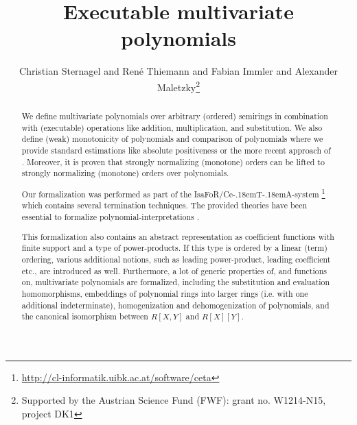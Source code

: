 \documentclass[11pt,a4paper]{article}
\newcommand\isafor{\textsf{IsaFoR}}
\newcommand\ceta{\textsf{Ce\kern-.18emT\kern-.18emA}}
\begin{document}
\title{Executable multivariate polynomials}
\author{Christian Sternagel and Ren\'e Thiemann and Fabian Immler and Alexander
Maletzky\thanks{Supported by the Austrian Science Fund (FWF): grant no. W1214-N15, project DK1}}
\maketitle

\begin{abstract}
  We define multivariate polynomials over arbitrary (ordered)
  semirings in combination with (executable) operations like addition, multiplication,
  and substitution. We also define (weak) monotonicity of polynomials
  and comparison of polynomials where we provide standard estimations 
  like absolute positiveness or the more recent
  approach of \cite{NZM10}. Moreover, it is proven
  that strongly normalizing (monotone) orders
  can be lifted to strongly normalizing (monotone) orders over polynomials.

  Our formalization was performed as part of the \isafor/\ceta-system 
  \cite{CeTA}\footnote{\url{http://cl-informatik.uibk.ac.at/software/ceta}}
  which
  contains several termination techniques. The provided theories have been
  essential to formalize polynomial-interpretations \cite{L79,Rational}.

  This formalization also contains an abstract representation as coefficient functions with finite
  support and a type of power-products. If this type is ordered by a linear (term) ordering, various
  additional notions, such as leading power-product, leading coefficient etc., are introduced as
  well. Furthermore, a lot of generic properties of, and functions on, multivariate polynomials 
  are formalized, including the substitution and evaluation homomorphisms, embeddings of polynomial 
  rings into larger rings (i.e. with one additional indeterminate), homogenization and 
  dehomogenization of polynomials, and the canonical isomorphism between $R[X,Y]$ and $R[X][Y]$.
\end{abstract}

\tableofcontents








\end{document}
